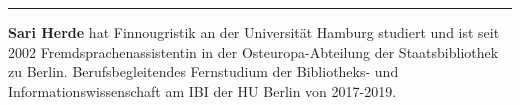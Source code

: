 \begin{center}\rule{0.5\linewidth}{0.5pt}\end{center}

\textbf{Sari Herde} hat Finnougristik an der Universität Hamburg
studiert und ist seit 2002 Fremdsprachenassistentin in der
Osteuropa-Abteilung der Staatsbibliothek zu Berlin. Berufsbegleitendes
Fernstudium der Bibliotheks- und Informationswissenschaft am IBI der HU
Berlin von 2017-2019.
